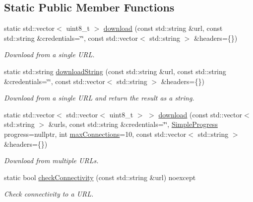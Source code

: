 \subsection*{Static Public Member Functions}
\begin{DoxyCompactItemize}
\item 
static std\+::vector$<$ uint8\+\_\+t $>$ \hyperlink{classdg_1_1deepcore_1_1network_1_1_http_downloader_a8f1ba1b79c2af5d051f6e8591cd0ea89}{download} (const std\+::string \&url, const std\+::string \&credentials=\char`\"{}\char`\"{}, const std\+::vector$<$ std\+::string $>$ \&headers=\{\})
\begin{DoxyCompactList}\small\item\em Download from a single U\+RL. \end{DoxyCompactList}\item 
static std\+::string \hyperlink{classdg_1_1deepcore_1_1network_1_1_http_downloader_a06013d9acaf746065be05b6571f2462a}{download\+String} (const std\+::string \&url, const std\+::string \&credentials=\char`\"{}\char`\"{}, const std\+::vector$<$ std\+::string $>$ \&headers=\{\})
\begin{DoxyCompactList}\small\item\em Download from a single U\+RL and return the result as a string. \end{DoxyCompactList}\item 
static std\+::vector$<$ std\+::vector$<$ uint8\+\_\+t $>$ $>$ \hyperlink{classdg_1_1deepcore_1_1network_1_1_http_downloader_a07d51f62025e158feeca83cbc40d8564}{download} (const std\+::vector$<$ std\+::string $>$ \&urls, const std\+::string \&credentials=\char`\"{}\char`\"{}, \hyperlink{group___utility_module_ga6763018df79e4bdbcd8cd14cea5342b2}{Simple\+Progress} progress=nullptr, int \hyperlink{classdg_1_1deepcore_1_1network_1_1_http_downloader_ac61d8926dce16d0041bb8ffddb1b2e2a}{max\+Connections}=10, const std\+::vector$<$ std\+::string $>$ \&headers=\{\})
\begin{DoxyCompactList}\small\item\em Download from multiple U\+R\+Ls. \end{DoxyCompactList}\item 
static bool \hyperlink{classdg_1_1deepcore_1_1network_1_1_http_downloader_ab82b59cab6622abae4998f5fde08e688}{check\+Connectivity} (const std\+::string \&url) noexcept
\begin{DoxyCompactList}\small\item\em Check connectivity to a U\+RL. \end{DoxyCompactList}\item 

\end{DoxyCompactItemize}
